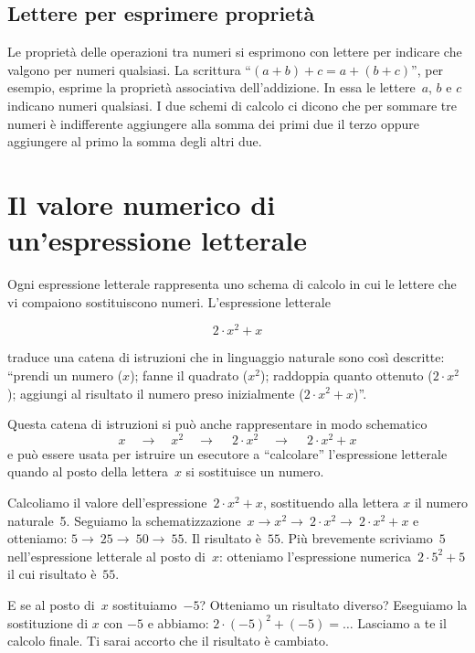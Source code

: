 \subsection{Lettere per esprimere proprietà}

Le proprietà delle operazioni tra numeri si esprimono con lettere per indicare che valgono per numeri
qualsiasi.
La scrittura ``$(a+b)+c=a+(b+c)$'', per esempio, esprime la proprietà associativa dell'addizione. In essa le lettere~$a$, $b$ e $c$ indicano
numeri qualsiasi. I due schemi di calcolo ci dicono che per sommare tre numeri è indifferente aggiungere alla somma
dei primi due il terzo oppure aggiungere al primo la somma degli altri due.

\vspazio\ovalbox{\risolvii \ref{ese:9.4}, \ref{ese:9.5}, \ref{ese:9.6}, \ref{ese:9.7}, \ref{ese:9.8}, \ref{ese:9.9}, \ref{ese:9.10}, \ref{ese:9.11}}

\section{Il valore numerico di un'espressione letterale}

Ogni espressione letterale rappresenta uno schema di calcolo in cui le lettere che vi compaiono sostituiscono numeri.
L'espressione letterale

\[2\cdot x^{2}+x\]

\noindent traduce una catena di istruzioni che in linguaggio naturale sono così
descritte: ``prendi un numero ($x$); fanne il quadrato ($x^2$); raddoppia quanto ottenuto ($2\cdot x^2$); aggiungi al risultato il numero preso inizialmente ($2\cdot x^{2}+x$)''.

Questa catena di istruzioni si può anche rappresentare in modo schematico
\[x\quad\rightarrow\quad x^{2}\quad\rightarrow\quad~2\cdot x^{2}\quad\rightarrow\quad~2\cdot x^{2}+x\]
e può essere usata per istruire un esecutore a ``calcolare'' l'espressione letterale
quando al posto della lettera~$x$ si sostituisce un numero.

Calcoliamo il valore dell'espressione~$2\cdot x^{2}+x$, sostituendo alla lettera $x$ il numero naturale~5.
Seguiamo la schematizzazione~$x\rightarrow x^{2}\rightarrow~2\cdot x^{2}\rightarrow~2\cdot x^{2}+x$ e otteniamo:
$5\rightarrow~25\rightarrow~50\rightarrow~55$.
Il risultato è~$55$.
Più brevemente scriviamo~$5$ nell'espressione letterale al posto di~$x$: otteniamo l'espressione numerica~$2\cdot 5^{2}+5$
il cui risultato è~$55$.

E se al posto di~$x$ sostituiamo~$-5$? Otteniamo un risultato diverso? Eseguiamo la sostituzione di $x$ con $-5$ e abbiamo: $2\cdot (-5)^{2}+(-5)=\ldots$ Lasciamo a te il calcolo finale. Ti sarai accorto che il
risultato è cambiato.

